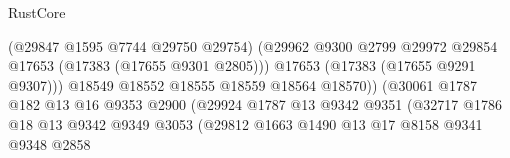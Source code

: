 \begin{lexlean}{RustCore}
\begin{coremodule}
                                                    (@29847 @1595 @7744 @29750 @29754)
                                                    (@29962
                                                      @9300
                                                      @2799
                                                      @29972
                                                      @29854
                                                      @17653
                                                      (@17383 (@17655 @9301 @2805)))
                                                    @17653
                                                    (@17383 (@17655 @9291 @9307)))
                                                  @18549
                                                  @18552
                                                  @18555
                                                  @18559
                                                  @18564
                                                  @18570))
                                              (@30061
                                                @1787
                                                @182
                                                @13
                                                @16
                                                @9353
                                                @2900
                                                (@29924
                                                  @1787
                                                  @13
                                                  @9342
                                                  @9351
                                                  (@32717
                                                    @1786
                                                    @18
                                                    @13
                                                    @9342
                                                    @9349
                                                    @3053
                                                    (@29812
                                                      @1663
                                                      @1490
                                                      @13
                                                      @17
                                                      @8158
                                                      @9341
                                                      @9348
                                                      @2858

\end{coremodule}
\end{lexlean}
